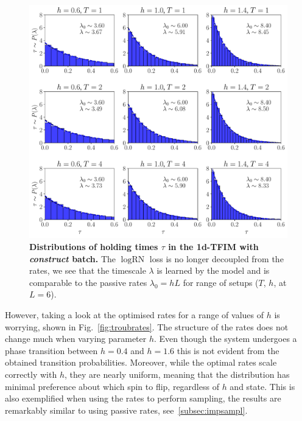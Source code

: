 \begin{figure}[H]
	\centering
	\includegraphics[width=1\linewidth]{Chapter5/Figs/Vector/troub}
	\caption[Distributions of holding times $\tau$ in the 1d-TFIM with \emph{construct} batch]{\textbf{Distributions of holding times $\tau$ in the 1d-TFIM with \emph{construct} batch.} The $\log\text{RN}$ loss is no longer decoupled from the rates, we see that the timescale $\lambda$ is learned by the model and is comparable to the passive rates $\lambda_0=hL$ for range of setups ($T$, $h$, at $L=6$).}
	\label{fig:troub}
\end{figure}
\noindent
However, taking a look at the optimised rates for a range of values of $h$ is worrying, shown in Fig.~\ref{fig:troubrates}. The structure of the rates does not change much when varying parameter $h$. Even though the system undergoes a phase transition between $h=0.4$ and $h=1.6$ this is not evident from the obtained transition probabilities. Moreover, while the optimal rates scale correctly with $h$, they are nearly uniform, meaning that the distribution has minimal preference about which spin to flip, regardless of $h$ and state. This is also exemplified when using the rates to perform sampling, the results are remarkably similar to using passive rates, see~\ref{subsec:impsampl}. 
